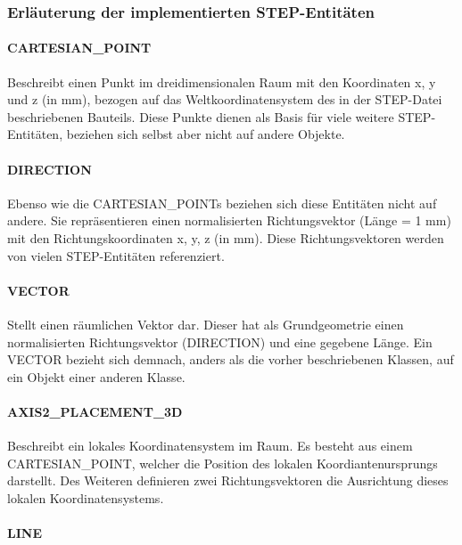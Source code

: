 \subsubsection{Erläuterung der implementierten STEP-Entitäten}
\label{sec:erklaerungstp}


\paragraph{CARTESIAN\_POINT}

Beschreibt einen Punkt im dreidimensionalen Raum mit den Koordinaten x, y und z (in mm), bezogen auf das Weltkoordinatensystem des in der STEP-Datei beschriebenen Bauteils. Diese Punkte dienen als Basis für viele weitere STEP-Entitäten, beziehen sich selbst aber nicht auf andere Objekte. 

\paragraph{DIRECTION}

Ebenso wie die CARTESIAN\_POINTs beziehen sich diese Entitäten nicht auf andere. Sie repräsentieren einen normalisierten Richtungsvektor (Länge = 1 mm) mit den Richtungskoordinaten x, y, z (in mm). Diese Richtungsvektoren werden von vielen STEP-Entitäten referenziert.

\paragraph{VECTOR}

Stellt einen räumlichen Vektor dar. Dieser hat als Grundgeometrie einen normalisierten Richtungsvektor (DIRECTION) und eine gegebene Länge. Ein VECTOR bezieht sich demnach, anders als die vorher beschriebenen Klassen, auf ein Objekt einer anderen Klasse.

\paragraph{AXIS2\_PLACEMENT\_3D}

Beschreibt ein lokales Koordinatensystem im Raum. Es besteht aus einem CARTESIAN\_POINT, welcher die Position des lokalen Koordiantenursprungs darstellt. Des Weiteren definieren zwei Richtungsvektoren die Ausrichtung dieses lokalen Koordinatensystems.

\paragraph{LINE}


